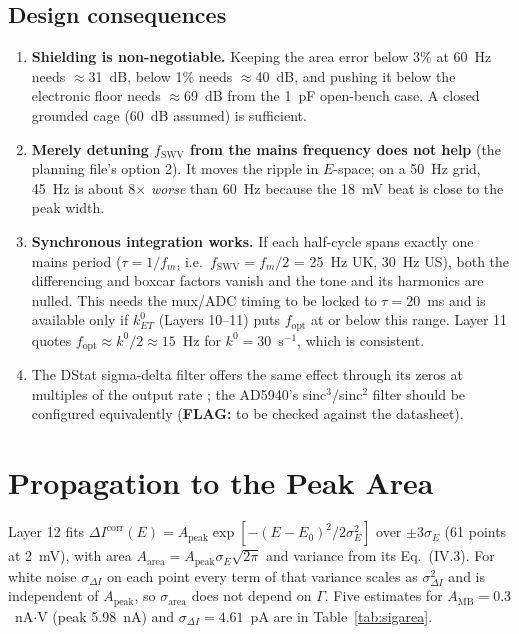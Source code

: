 \documentclass[10pt]{article}
\numberwithin{equation}{section}
\newcommand{\flag}[1]{\textbf{FLAG:} #1}
\begin{document}
\subsection{Design consequences}
\begin{enumerate}[leftmargin=1.5em,itemsep=0pt,topsep=0pt]
\item \textbf{Shielding is non-negotiable.} Keeping the area error below 3\% at 60~Hz needs $\approx$31~dB, below 1\% needs $\approx$40~dB, and pushing it below the electronic floor needs $\approx$69~dB from the 1~pF open-bench case. A closed grounded cage (60~dB assumed) is sufficient.
\item \textbf{Merely detuning $f_{\text{SWV}}$ from the mains frequency does not help} (the planning file's option 2). It moves the ripple in $E$-space; on a 50~Hz grid, 45~Hz is about 8$\times$ \emph{worse} than 60~Hz because the 18~mV beat is close to the peak width.
\item \textbf{Synchronous integration works.} If each half-cycle spans exactly one mains period ($\tau = 1/f_m$, i.e.\ $f_{\text{SWV}} = f_m/2$ = 25~Hz UK, 30~Hz US), both the differencing and boxcar factors vanish and the tone and its harmonics are nulled. This needs the mux/ADC timing to be locked to $\tau = 20$~ms and is available only if $k^0_{ET}$ (Layers 10--11) puts $f_{\text{opt}}$ at or below this range. Layer 11 quotes $f_{\text{opt}} \approx k^0/2 \approx 15$~Hz for $k^0 = 30$~s$^{-1}$, which is consistent.
\item The DStat sigma-delta filter offers the same effect through its zeros at multiples of the output rate \cite{dstat}; the AD5940's sinc$^3$/sinc$^2$ filter should be configured equivalently (\flag{to be checked against the datasheet}).
\end{enumerate}

\section{Propagation to the Peak Area}
Layer 12 fits $\Delta I^{\text{corr}}(E) = A_{\text{peak}}\exp[-(E-E_0)^2/2\sigma_E^2]$ over $\pm3\sigma_E$ (61 points at 2~mV), with area $A_{\text{area}} = A_{\text{peak}}\sigma_E\sqrt{2\pi}$
and variance from its Eq.~(IV.3). For white noise $\sigma_{\Delta I}$ on each point every term of that variance scales as $\sigma_{\Delta I}^2$ and is independent of $A_{\text{peak}}$, so $\sigma_{\text{area}}$ does not depend on $\Gamma$.
Five estimates for $A_{\text{MB}} = 0.3$~nA$\cdot$V (peak 5.98~nA) and $\sigma_{\Delta I} = 4.61$~pA are in Table~\ref{tab:sigarea}.
\end{document}
